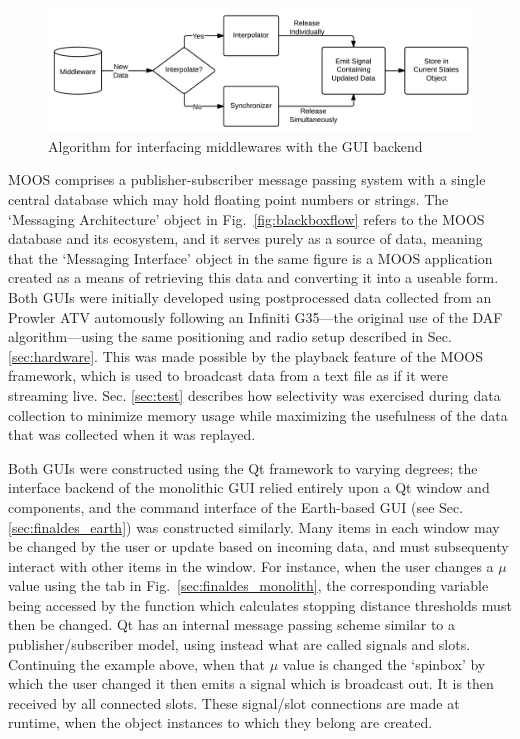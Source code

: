 \begin{figure}[ht] \centering 
    \includegraphics[width=6.5in]{./figs/middleware_diagram.png}
    \caption{Algorithm for interfacing middlewares with the GUI backend} \label{fig:midw_diagram}
\end{figure}

MOOS comprises a publisher-subscriber message passing system with a single central database which may hold floating point numbers or strings. The `Messaging Architecture' object in Fig.~\ref{fig:blackboxflow} refers to the MOOS database and its ecosystem, and it serves purely as a source of data, meaning that the `Messaging Interface' object in the same figure is a MOOS application created as a means of retrieving this data and converting it into a useable form.
Both GUIs were initially developed using postprocessed data collected from an Prowler ATV automously following an Infiniti G35---the original use of the DAF algorithm---using the same positioning and radio setup described in Sec. \ref{sec:hardware}. This was made possible by the playback feature of the MOOS framework, which is used to broadcast data from a text file as if it were streaming live.
Sec. \ref{sec:test} describes how selectivity was exercised during data collection to minimize memory usage while maximizing the usefulness of the data that was collected when it was replayed.

Both GUIs were constructed using the Qt \cite{qt} framework to varying degrees; the interface backend of the monolithic GUI relied entirely upon a Qt window and components, and the command interface of the Earth-based GUI (see Sec. \ref{sec:finaldes_earth}) was constructed similarly. Many items in each window may be changed by the user or update based on incoming data, and must subsequenty interact with other items in the window. For instance, when the user changes a $\mu$ value using the tab in Fig.~\ref{sec:finaldes_monolith}, the corresponding variable being accessed by the function which calculates stopping distance thresholds must then be changed. Qt has an internal message passing scheme similar to a publisher/subscriber model, using instead what are called signals and slots. Continuing the example above, when that $\mu$ value is changed the `spinbox' by which the user changed it then emits a signal which is broadcast out. It is then received by all connected slots. These signal/slot connections are made at runtime, when the object instances to which they belong are created.

